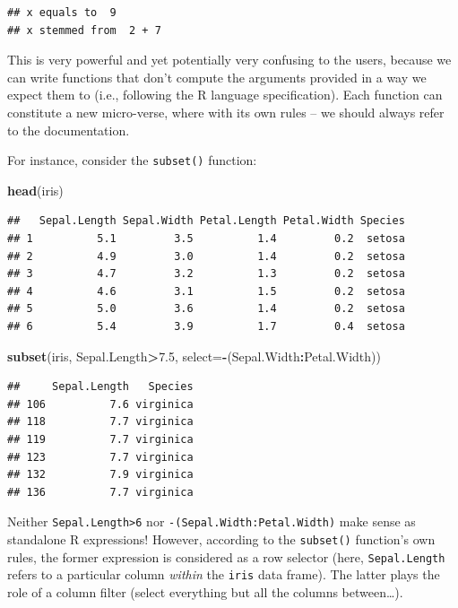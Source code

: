 \documentclass[10pt,b5paper,krantz1]{krantz}
\newenvironment{Shaded}{\begin{snugshade}}{\end{snugshade}}
\newcommand{\DataTypeTok}[1]{\textcolor[rgb]{0.27,0.27,0.27}{#1}}
\newcommand{\FloatTok}[1]{\textcolor[rgb]{0.06,0.06,0.06}{#1}}
\newcommand{\KeywordTok}[1]{\textcolor[rgb]{0.27,0.27,0.27}{\textbf{#1}}}
\newcommand{\NormalTok}[1]{#1}
\newcommand{\OperatorTok}[1]{\textcolor[rgb]{0.43,0.43,0.43}{\textbf{#1}}}
\begin{document}
\begin{verbatim}
## x equals to  9 
## x stemmed from  2 + 7
\end{verbatim}

This is very powerful and yet potentially very confusing to the users, because
we can write functions that don't compute the arguments provided
in a way we expect them to (i.e., following the R language specification).
Each function can constitute a new micro-verse, where with its own rules --
we should always refer to the documentation.

For instance, consider the \texttt{subset()} function:

\begin{Shaded}
\begin{Highlighting}[]
\KeywordTok{head}\NormalTok{(iris)}
\end{Highlighting}
\end{Shaded}

\begin{verbatim}
##   Sepal.Length Sepal.Width Petal.Length Petal.Width Species
## 1          5.1         3.5          1.4         0.2  setosa
## 2          4.9         3.0          1.4         0.2  setosa
## 3          4.7         3.2          1.3         0.2  setosa
## 4          4.6         3.1          1.5         0.2  setosa
## 5          5.0         3.6          1.4         0.2  setosa
## 6          5.4         3.9          1.7         0.4  setosa
\end{verbatim}

\begin{Shaded}
\begin{Highlighting}[]
\KeywordTok{subset}\NormalTok{(iris, Sepal.Length}\OperatorTok{>}\FloatTok{7.5}\NormalTok{, }\DataTypeTok{select=}\OperatorTok{-}\NormalTok{(Sepal.Width}\OperatorTok{:}\NormalTok{Petal.Width))}
\end{Highlighting}
\end{Shaded}

\begin{verbatim}
##     Sepal.Length   Species
## 106          7.6 virginica
## 118          7.7 virginica
## 119          7.7 virginica
## 123          7.7 virginica
## 132          7.9 virginica
## 136          7.7 virginica
\end{verbatim}

Neither \texttt{Sepal.Length\textgreater{}6} nor \texttt{-(Sepal.Width:Petal.Width)} make sense
as standalone R expressions! However, according to the \texttt{subset()} function's
own rules, the former expression is considered as a row selector
(here, \texttt{Sepal.Length} refers to a particular column \emph{within} the \texttt{iris} data frame).
The latter plays the role of a column filter (select everything but all the columns
between\ldots{}).
\end{document}
